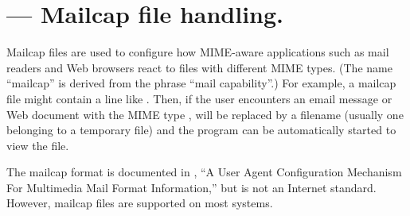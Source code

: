 \section{ ---
         Mailcap file handling.}



Mailcap files are used to configure how MIME-aware applications such
as mail readers and Web browsers react to files with different MIME
types. (The name ``mailcap'' is derived from the phrase ``mail
capability''.)  For example, a mailcap file might contain a line like
.  Then, if the user encounters an email
message or Web document with the MIME type ,
 will be replaced by a filename (usually one belonging to a
temporary file) and the  program can be automatically
started to view the file.

The mailcap format is documented in , ``A User Agent
Configuration Mechanism For Multimedia Mail Format Information,'' but
is not an Internet standard.  However, mailcap files are supported on
most \UNIX{} systems.

